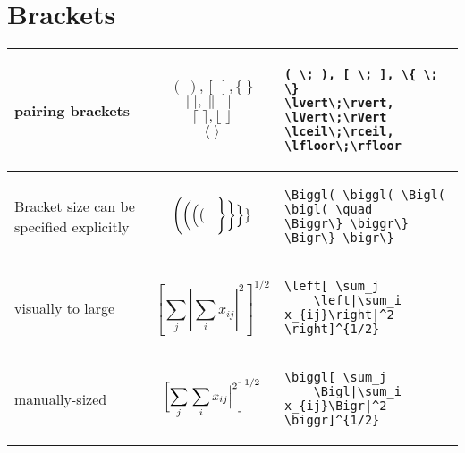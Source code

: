 \section{Brackets}
\begin{longtable}{p{3cm} |p{5cm}| p{5cm}}\hline
pairing brackets & 
\[
     (\;), [ \; ], \{ \; \}
 \]
 \[
    \lvert\;\rvert, \lVert\;\rVert
\]
\[
    \lceil\;\rceil, \lfloor\;\rfloor
\]
\[
    \langle\;\rangle
\] &
\begin{verbatim}
( \; ), [ \; ], \{ \; \}
\lvert\;\rvert, \lVert\;\rVert
\lceil\;\rceil, \lfloor\;\rfloor
\end{verbatim}\\\hline
Bracket size can be specified explicitly &
\[
\Biggl( \biggl( \Bigl( \bigl( \quad
\Biggr\} \biggr\} \Bigr\} \bigr\}
\] &
\begin{verbatim}
\Biggl( \biggl( \Bigl( \bigl( \quad
\Biggr\} \biggr\} \Bigr\} \bigr\}
\end{verbatim}\\\hline
visually to large &
\[
\left[ \sum_j
    \left|\sum_i x_{ij}\right|^2
\right]^{1/2}
\] &
\begin{verbatim}
\left[ \sum_j
    \left|\sum_i x_{ij}\right|^2
\right]^{1/2}
\end{verbatim}\\\hline
manually-sized &
\[
    \biggl[ \sum_j
        \Bigl|\sum_i x_{ij}\Bigr|^2
    \biggr]^{1/2}
\] &
\begin{verbatim}
\biggl[ \sum_j
    \Bigl|\sum_i x_{ij}\Bigr|^2
\biggr]^{1/2}
\end{verbatim}
\\\hline
\end{longtable}


